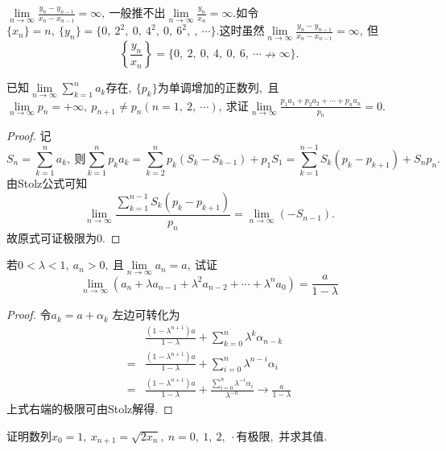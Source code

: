 \begin{note}
	$\lim\limits_{n\rightarrow\infty}\frac{y_n-y_{n-1}}{x_n-x_{n-1}}=\infty,\ $一般推不出$\lim\limits_{n\rightarrow\infty}\frac{y_n}{x_n}=\infty.$如令$\{x_n\}=n,\ \{y_n\}=\{0,\ 2^2,\ 0,\ 4^2,\ 0,\ 6^2,\ ,\ \cdots\}.$这时虽然$\lim\limits_{n\rightarrow\infty}\frac{y_n-y_{n-1}}{x_n-x_{n-1}}=\infty,\ $但
	$$\left\{\frac{y_n}{x_n}\right\}=\{0,\ 2,\ 0,\ 4,\ 0,\ 6,\ \cdots\nrightarrow \infty\}.$$
\end{note}
\newpage
\begin{problem}
	已知$\lim\limits_{n\rightarrow\infty}\sum\limits_{k=1}^{n}a_k$存在$,\ \{p_k\}$为单调增加的正数列,\ 且$\lim\limits_{n\rightarrow\infty}p_n=+\infty,\ p_{n+1}\neq p_n(n=1,\ 2,\ \cdots),\ $求证$\lim\limits_{n\rightarrow\infty}\frac{p_1a_1+p_2a_2+\cdots+p_na_n}{p_n}=0.$
\end{problem}
\begin{proof}
	记
	$$S_n=\sum_{k=1}^{n}a_k,\ \text{则}\sum_{k=1}^{n}p_ka_k=\sum_{k=2}^{n}p_k(S_k-S_{k-1})+p_1S_1=\sum_{k=1}^{n-1}S_k(p_k-p_{k+1})+S_np_n.$$
	由Stolz公式可知
	$$\lim\limits_{n\rightarrow\infty}\frac{\sum_{k=1}^{n-1}S_k(p_k-p_{k+1})}{p_n}=\lim\limits_{n\rightarrow\infty}(-S_{n-1}).$$
	故原式可证极限为$0.$
\end{proof}
\newpage
\begin{problem}
	若$0<\lambda<1,\ a_n>0,\ $且$\lim\limits_{n\rightarrow\infty}a_n=a,\ $试证
	$$\lim_{n\rightarrow\infty}(a_n+\lambda a_{n-1}+\lambda^2a_{n-2}+\cdots+\lambda^na_0)=\frac{a}{1-\lambda}$$
\end{problem}
\begin{proof}
	令$a_k=a+\alpha_k$
	左边可转化为
	$$\begin{aligned}
		&\frac{(1-\lambda^{n+1})a}{1-\lambda}+\sum_{k=0}^{n}\lambda^k\alpha_{n-k}\\
		=&\frac{(1-\lambda^{n+1})a}{1-\lambda}+\sum_{i=0}^{n}\lambda^{n-i}\alpha_i\\
		=&\frac{(1-\lambda^{n+1})a}{1-\lambda}+\frac{\sum\limits_{i=0}^{n}\lambda^{-i}\alpha_i}{\lambda^{-n}}\rightarrow\frac{a}{1-\lambda}
	\end{aligned}$$
	上式右端的极限可由Stolz解得.
\end{proof}
\newpage
\begin{problem}
	证明数列$x_0=1,\ x_{n+1}=\sqrt{2x_n},\ n=0,\ 1,\ 2,\ \cdot$有极限,\ 并求其值.
\end{problem}
